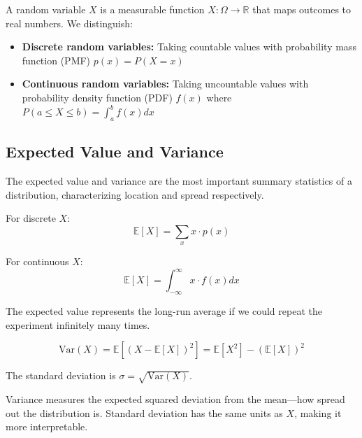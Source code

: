 \begin{definition}
A random variable $X$ is a measurable function $X: \Omega \rightarrow \mathbb{R}$ that maps outcomes to real numbers. We distinguish:
\begin{itemize}
    \item \textbf{Discrete random variables:} Taking countable values with probability mass function (PMF) $p(x) = P(X = x)$
    \item \textbf{Continuous random variables:} Taking uncountable values with probability density function (PDF) $f(x)$ where $P(a \leq X \leq b) = \int_a^b f(x) dx$
\end{itemize}
\end{definition}

\subsection{Expected Value and Variance}

The expected value and variance are the most important summary statistics of a distribution, characterizing location and spread respectively.

\begin{definition}
For discrete $X$:
\begin{equation}
\mathbb{E}[X] = \sum_x x \cdot p(x)
\end{equation}

For continuous $X$:
\begin{equation}
\mathbb{E}[X] = \int_{-\infty}^{\infty} x \cdot f(x) dx
\end{equation}

The expected value represents the long-run average if we could repeat the experiment infinitely many times.
\end{definition}

\begin{definition}
\begin{equation}
\text{Var}(X) = \mathbb{E}[(X - \mathbb{E}[X])^2] = \mathbb{E}[X^2] - (\mathbb{E}[X])^2
\end{equation}

The standard deviation is $\sigma = \sqrt{\text{Var}(X)}$.

Variance measures the expected squared deviation from the mean—how spread out the distribution is. Standard deviation has the same units as $X$, making it more interpretable.
\end{definition}

